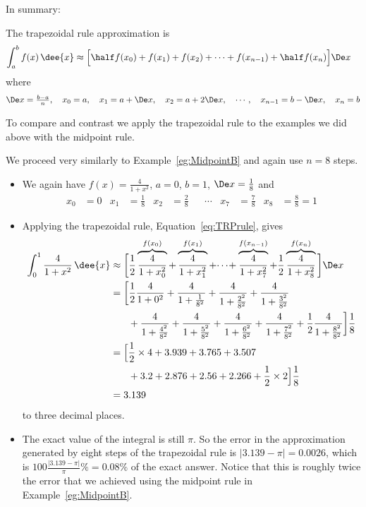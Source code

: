 In summary:
\begin{impeqn}\label{eq:TRPrule}
The trapezoidal rule approximation is
\begin{align*}
\int_a^b f(x)\,\dee{x}
&\approx\Big[\half f(x_0)+f(x_1)+f(x_2)+\cdots+ f(x_{n-1})+\half f(x_n)\Big]\De x
\end{align*}
where
\begin{align*}
\De x = \tfrac{b-a}{n},\quad
x_0=a,\quad x_1=a+\De x,\quad
 x_2=a+2\De x,\quad
\cdots,\quad x_{n-1}=b-\De x,\quad
 x_n=b
\end{align*}
\end{impeqn}

To compare and contrast we apply the trapezoidal rule to the examples we did above with
the midpoint rule.
\begin{eg}\label{eg:TrapB}
\soln We proceed very similarly to Example~\ref{eg:MidpointB} and again use $n=8$ steps.
\begin{itemize}
 \item We again have $f(x)=\frac{4}{1+x^2}$, $a=0$, $b=1$, $\De x=\tfrac{1}{8}$ and
\begin{align*}
x_0&=0 & x_1&=\tfrac{1}{8} & x_2&=\tfrac{2}{8}
&& \cdots &
x_7&=\tfrac{7}{8}&
x_8&=\tfrac{8}{8}=1
\end{align*}
\item Applying the trapezoidal rule, Equation~\eqref{eq:TRPrule}, gives
\begin{align*}
\int_0^1 \frac{4}{1+x^2}\,\dee{x}
&\approx
\bigg[\frac{1}{2}\overbrace{\frac{4}{1+x_0^2}}^{f(x_0)}
            +\overbrace{\frac{4}{1+x_1^2}}^{f(x_1)}
            +\!\cdots\!
             +\overbrace{\frac{4}{1+x_7^2}}^{f(x_{n-1})}
             +\frac{1}{2}\overbrace{\frac{4}{1+x_8^2}}^{f(x_n)}
             \bigg]\De x \\
&=\bigg[\frac{1}{2}\frac{4}{1+0^2}+
             \frac{4}{1+\tfrac{1}{8^2}}+
             \frac{4}{1+\tfrac{2^2}{8^2}}+
             \frac{4}{1+\tfrac{3^2}{8^2}}\\
&\hskip.25in +\frac{4}{1+\tfrac{4^2}{8^2}}+
             \frac{4}{1+\tfrac{5^2}{8^2}}+
             \frac{4}{1+\tfrac{6^2}{8^2}}+
             \frac{4}{1+\tfrac{7^2}{8^2}}+
        \frac{1}{2}\frac{4}{1+\tfrac{8^2}{8^2}}\bigg]\frac{1}{8}\\
&=\Big[\frac{1}{2}\times 4+
             3.939+
             3.765+
             3.507\\
&\hskip.25in +3.2+
             2.876+
             2.56+
             2.266+
        \frac{1}{2}\times 2\Big]\frac{1}{8}\\
&=3.139
\end{align*}
to three decimal places.
\item The exact value of the integral is still $\pi$. So the error in the approximation
generated by eight steps  of the trapezoidal rule is  $|3.139-\pi|=0.0026$, which is
$100\tfrac{|3.139-\pi|}{\pi}\% =0.08\%$ of the exact answer.
Notice that this is roughly twice the error that we achieved using the midpoint
rule in Example~\ref{eg:MidpointB}.
\end{itemize}
\end{eg}

